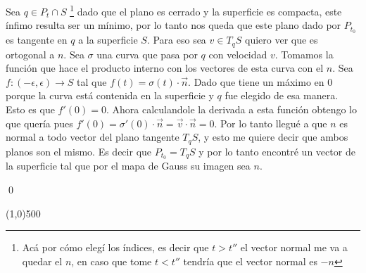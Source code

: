 \documentclass{article}
\begin{document}
	Sea $q \in P_t \cap S $ \footnote{Acá por cómo elegí los índices, es decir que $t > t''$ el vector normal me va a quedar el $n$, en caso que tome $t < t''$ tendría que el vector normal es $-n$} dado que el plano es cerrado y la superficie es compacta, este ínfimo resulta ser un mínimo, por lo tanto nos queda que este plano dado por $P_{t_0}$ es tangente en $q$ a la superficie $S$. Para eso sea $v \in T_q S$ quiero ver que es ortogonal a $n$. Sea $\sigma$ una curva que pasa por $q$ con velocidad $v$. Tomamos la función que hace el producto interno con los vectores de esta curva con el $n$. Sea $f:(-\epsilon,\epsilon) \to S$ tal que $f(t)= \sigma(t) \cdot \vec{n}$. Dado que tiene un máximo en $0$ porque la curva está contenida en la superficie y $q$ fue elegido de esa manera. Esto es que $f'(0) = 0$. Ahora calculandole la derivada a esta función obtengo lo que quería pues $f'(0) = \sigma'(0)\cdot\vec{n} = \vec{v}\cdot\vec{n} = 0$. Por lo tanto llegué a que $n$ es normal a todo vector del plano tangente $T_q S$, y esto me quiere decir que ambos planos son el mismo. Es decir que $P_{t_0} = T_q S$ y por lo tanto encontré un vector de la superficie tal que por el mapa de Gauss su imagen sea $n$.


	\qed

	\line(1,0){500}

	\bigskip

	
	
\end{document}
